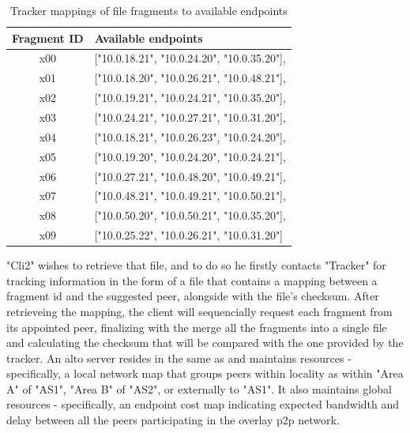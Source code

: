 \begin{table}[H]
\centering
\hspace*{-0.5em}
\begin{tabular}{|c|l|}
    \hline
    \textbf{Fragment ID} & \textbf{Available endpoints}                  \\ \hline
    x00                  & ["10.0.18.21", "10.0.24.20", "10.0.35.20"],   \\ \hline
    x01                  & ["10.0.18.20", "10.0.26.21", "10.0.48.21"],   \\ \hline
    x02                  & ["10.0.19.21", "10.0.24.21", "10.0.35.20"],   \\ \hline
    x03                  & ["10.0.24.21", "10.0.27.21", "10.0.31.20"],   \\ \hline
    x04                  & ["10.0.18.21", "10.0.26.23", "10.0.24.20"],   \\ \hline
    x05                  & ["10.0.19.20", "10.0.24.20", "10.0.24.21"],   \\ \hline
    x06                  & ["10.0.27.21", "10.0.48.20", "10.0.49.21"],   \\ \hline
    x07                  & ["10.0.48.21", "10.0.49.21", "10.0.50.21"],   \\ \hline
    x08                  & ["10.0.50.20", "10.0.50.21", "10.0.35.20"],   \\ \hline
    x09                  & ["10.0.25.22", "10.0.26.21", "10.0.31.20"]    \\ \hline
\end{tabular}
\caption{Tracker mappings of file fragments to available endpoints}
\label{table:fragment-allocations}
\end{table}

    "Cli2" wishes to retrieve that file, and to do so he firstly contacts "Tracker" for tracking information in the form of a file that contains a mapping between a fragment \gls{id} and the suggested peer, alongside with the file's checksum.
    After retrieveing the mapping, the client will sequencially request each fragment from its appointed peer, finalizing with the merge all the fragments into a single file and calculating the checksum that will be compared with the one provided by the tracker.
    An \gls{alto} server resides in the same \gls{as} and maintains resources - specifically, a local network map that groups peers within locality as within "Area A" of "AS1", "Area B" of "AS2", or externally to "AS1".
    It also maintains global resources - specifically, an endpoint cost map indicating expected bandwidth and delay between all the peers participating in the overlay \gls{p2p} network.

